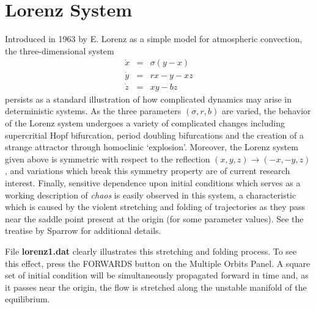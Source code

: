 \section{Lorenz System}

\noindent Introduced in 1963 by E. Lorenz \cite{lorenz1} as a simple model for
atmospheric convection, the three-dimensional system
\begin{eqnarray*}
    \dot{x} & = & \sigma (y - x) \\
    \dot{y} & = & r x - y - x z \\
    \dot{z} & = & xy - bz 
\end{eqnarray*}
persists as a standard illustration of how complicated dynamics may arise in
deterministic systems.   As the three parameters $(\sigma,r,b)$ are varied, the
behavior of the Lorenz system undergoes a variety of complicated changes       
including supercritial Hopf bifurcation, period doubling bifurcations and
the creation of a strange attractor through homoclinic `explosion'.  Moreover, 
the Lorenz system given above is symmetric with respect to the reflection
$(x,y,z) \rightarrow (-x,-y,z)$, and variations which break this symmetry property
are of current research interest.
Finally, sensitive dependence upon initial
conditions which serves as a working description of {\em chaos} is easily observed
in this system, a characteristic which is caused by the violent stretching and
folding of trajectories as they pass near the saddle point present at the origin
(for some parameter values).
See the treatise by Sparrow \cite{sparrow1} for additional details. 
\medskip

\noindent File {\bf lorenz1.dat} clearly illustrates this stretching and folding
process.  To see this effect, press the FORWARDS button on the Multiple Orbits Panel.
A square set of initial condition will be simultaneously propagated forward in time
and, as it passes near the origin,  the flow is stretched along the unstable manifold
of the equilibrium.  
